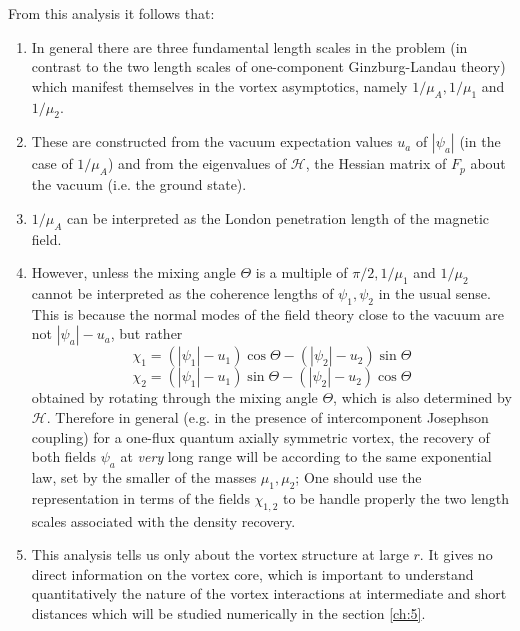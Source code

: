 From this analysis it follows that:
\begin{enumerate}
    \item In general there are three fundamental length scales in the problem 
        (in contrast to the two length scales of one-component Ginzburg-Landau 
        theory) which manifest themselves in the vortex asymptotics, namely 
        \( 1/\mu_A, 1/\mu_1 \) and \( 1/\mu_2 \).
    \item These are constructed from the vacuum expectation values \( u_a \) 
        of \( |\psi_a| \) (in the case of \( 1/\mu_A \)) and from the 
        eigenvalues of \( \mathcal{H} \), the Hessian matrix of \( F_p \) 
        about the vacuum (i.e. the ground state).
    \item \( 1/\mu_{A} \) can be interpreted as the London penetration length 
        of the magnetic field.
    \item However, unless the mixing angle \( \Theta \) is a multiple of 
        \( \pi/2, 1/\mu_1 \) and \( 1/\mu_2 \) cannot be interpreted as the 
        coherence lengths of \( \psi_1, \psi_2 \) in the usual sense. This is 
        because the normal modes of the field theory close to the vacuum are 
        not \( |\psi_a| - u_a \), but rather
        \[ 
            \chi_1 = (|\psi_1| - u_1)\cos\Theta - (|\psi_2| - u_2)\sin\Theta 
        \]
        \[ 
            \chi_2 = (|\psi_1| - u_1)\sin\Theta - (|\psi_2| - u_2)\cos\Theta 
        \]
        obtained by rotating through the mixing angle \( \Theta \), which is 
        also determined by \( \mathcal{H} \). Therefore in general (e.g. in 
        the presence of intercomponent Josephson coupling) for a one-flux 
        quantum axially symmetric vortex, the recovery of both fields 
        \( \psi_a \) at \emph{very} long range will be according to the same 
        exponential law, set by the smaller of the masses \( \mu_1, \mu_2 \); 
        One should use the representation in terms of the fields 
        \( \chi_{1,2} \) to be handle properly the two length scales 
        associated with the density recovery.
    \item This analysis tells us only about the vortex structure at large 
        \( r \). It gives no direct information on the vortex core, which is 
        important to understand quantitatively the nature of the vortex 
        interactions at intermediate and short distances which will be 
        studied numerically in the section \ref{ch:5}.
\end{enumerate}

